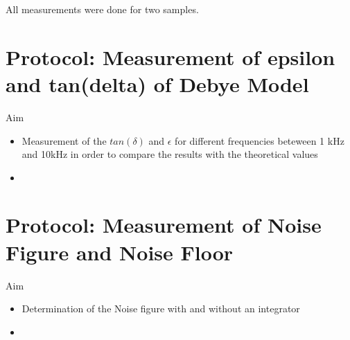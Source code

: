 All measurements were done for two samples. 



\section{Protocol: Measurement of epsilon and tan(delta) of Debye Model}
\large{Aim} \\
\begin{itemize}
\item Measurement of the $tan(\delta)$ and $\epsilon$ for different frequencies beteween 1 kHz and 10kHz in order to compare the results with the theoretical values
\item  
\end{itemize}



\section{Protocol: Measurement of Noise Figure and Noise Floor}
\large{Aim} \\
\begin{itemize}
\item Determination of the Noise figure with and without an integrator
\item  
\end{itemize}

